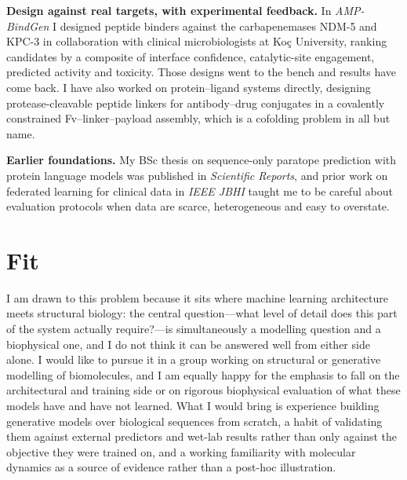 \documentclass[11pt]{article}
\begin{document}
\textbf{Design against real targets, with experimental feedback.} In \emph{AMP-BindGen} I designed
peptide binders against the carbapenemases NDM-5 and KPC-3 in collaboration with clinical
microbiologists at Koç University, ranking candidates by a composite of interface confidence,
catalytic-site engagement, predicted activity and toxicity. Those designs went to the bench and
results have come back. I have also worked on protein--ligand systems directly, designing
protease-cleavable peptide linkers for antibody--drug conjugates in a covalently constrained
Fv--linker--payload assembly, which is a cofolding problem in all but name.

\textbf{Earlier foundations.} My BSc thesis on sequence-only paratope prediction with protein
language models was published in \emph{Scientific Reports}, and prior work on federated learning for
clinical data in \emph{IEEE JBHI} taught me to be careful about evaluation protocols when data are
scarce, heterogeneous and easy to overstate.

\section*{Fit}

I am drawn to this problem because it sits where machine learning architecture meets structural
biology: the central question---what level of detail does this part of the system actually
require?---is simultaneously a modelling question and a biophysical one, and I do not think it can be
answered well from either side alone. I would like to pursue it in a group working on structural or
generative modelling of biomolecules, and I am equally happy for the emphasis to fall on the
architectural and training side or on rigorous biophysical evaluation of what these models have and
have not learned. What I would bring is experience building generative models over biological
sequences from scratch, a habit of validating them against external predictors and wet-lab results
rather than only against the objective they were trained on, and a working familiarity with
molecular dynamics as a source of evidence rather than a post-hoc illustration.
\end{document}
